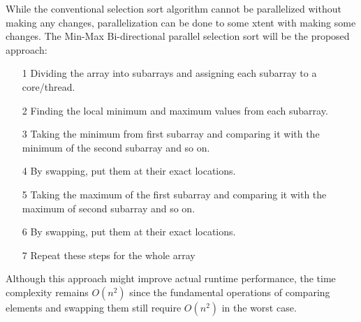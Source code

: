 \documentclass[a4paper]{exam}
\begin{document}
\begin{questions}
\begin{solution}
While the conventional selection sort algorithm cannot be parallelized without making any changes, parallelization can be done to some xtent with making some changes.
The Min-Max Bi-directional parallel selection sort \cite{thabit2013novel} will be the proposed approach:
\begin{itemize}
    \item[1] Dividing the array into subarrays and assigning each subarray to a core/thread.
    \item[2] Finding the local minimum and maximum values from each subarray.
    \item[3] Taking the minimum from first subarray and comparing it with the minimum of the second subarray and so on.
    \item[4] By swapping, put them at their exact locations.
    \item[5] Taking the maximum of the first subarray and comparing it with the maximum of second subarray and so on.
    \item[6] By swapping, put them at their exact locations.
    \item[7] Repeat these steps for the whole array     
\end{itemize}
Although this approach might improve actual runtime performance, the time complexity remains $O(n^2)$ since the fundamental operations of comparing elements and swapping them still require $O(n^2)$ in the worst case.
\end{solution}

\end{questions}


\end{document}
